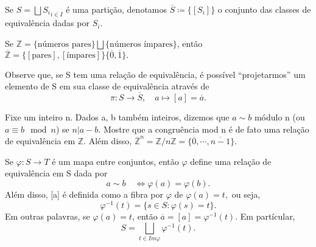 \documentclass[algebra_notes.tex]{subfiles}
\begin{document}
\begin{def*}
	Se $S = \bigsqcup{S_{i}}_{i\in I}$ é uma partição, denotamos $\overline{S}\coloneqq\{[S_{i}]\} $ o conjunto das classes
	de equivalência dadas por $S_{i}.$
\end{def*}
\begin{example*}
	Se $\mathbb{Z}=\{\text{números pares}\}\bigsqcup{\{\text{números ímpares}\}}$, então $\overline{\mathbb{Z}} =\{[\text{pares}], [\text{ímpares}]\}
		\{\overline{0}, \overline{1}\}.$
\end{example*}
Observe que, se S tem uma relação de equivalência, é possível ``projetarmos'' um elemento de S em sua classe de equivalência através de
$$
	\pi:S\rightarrow \overline{S},\quad a\mapsto[a]=\overline{a}.
$$
\begin{example*}
	Fixe um inteiro n. Dados a, b também inteiros, dizemos que $a\sim b$ módulo n (ou $a\equiv b\mod n$) se $n|a-b.$ Mostre que
	a congruência mod n é de fato uma relação de equivalência em $\mathbb{Z}.$ Além disso, $\overline{\mathbb{Z}}^{n} = \mathbb{Z}/n\mathbb{Z} = \{\overline{0}, \cdots, \overline{n-1}\}.$
\end{example*}
\begin{def*}
	Se $\varphi:S\rightarrow T$ é um mapa entre conjuntos, então $\varphi$ define uma relação de equivalência em S dada por
	$$
		a\sim b\quad \Longleftrightarrow \varphi(a) = \varphi(b).
	$$
	Além disso, [a] é definida como a fibra por $\varphi$ de $\varphi(a) = t,$ ou seja,
	$$
		\varphi^{-1}(t) = \{s\in S: \varphi(s) = t\}.
	$$
	Em outras palavras, se $\varphi(a) = t$, então $\overline{a} = [a] = \varphi^{-1}(t).$ Em partícular,
	$$
		S = \bigsqcup_{t\in Im\varphi}{\varphi^{-1}(t)}.
	$$
\end{def*}
\end{document}

